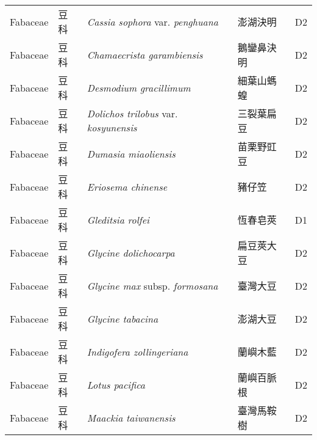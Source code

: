 {\begin{longtable}{p{2.5cm}p{2.5cm}p{4.5cm}p{2.5cm}p{3cm}}
    Fabaceae & 豆科 & \textit{Cassia sophora} var. \textit{penghuana}  & 澎湖決明 & D2 \index{Cassia@\textit{Cassia}!sophora@\textit{sophora}!var. penghuana@var. \textit{penghuana}}  \index{澎湖決明} \\
    Fabaceae & 豆科 & \textit{Chamaecrista garambiensis}  & 鵝鑾鼻決明 & D2 \index{Chamaecrista@\textit{Chamaecrista}!garambiensis@\textit{garambiensis}}  \index{鵝鑾鼻決明} \\
    Fabaceae & 豆科 & \textit{Desmodium gracillimum}  & 細葉山螞蝗 & D2 \index{Desmodium@\textit{Desmodium}!gracillimum@\textit{gracillimum}}  \index{細葉山螞蝗} \\
    Fabaceae & 豆科 & \textit{Dolichos trilobus} var. \textit{kosyunensis}  & 三裂葉扁豆 & D2 \index{Dolichos@\textit{Dolichos}!trilobus@\textit{trilobus}!var. kosyunensis@var. \textit{kosyunensis}}  \index{三裂葉扁豆} \\
    Fabaceae & 豆科 & \textit{Dumasia miaoliensis}  & 苗栗野豇豆 & D2 \index{Dumasia@\textit{Dumasia}!miaoliensis@\textit{miaoliensis}}  \index{苗栗野豇豆} \\
    Fabaceae & 豆科 & \textit{Eriosema chinense}  & 豬仔笠 & D2 \index{Eriosema@\textit{Eriosema}!chinense@\textit{chinense}}  \index{豬仔笠} \\
    Fabaceae & 豆科 & \textit{Gleditsia rolfei}  & 恆春皂莢 & D1 \index{Gleditsia@\textit{Gleditsia}!rolfei@\textit{rolfei}}  \index{恆春皂莢} \\
    Fabaceae & 豆科 & \textit{Glycine dolichocarpa}  & 扁豆莢大豆 & D2 \index{Glycine@\textit{Glycine}!dolichocarpa@\textit{dolichocarpa}}  \index{扁豆莢大豆} \\
    Fabaceae & 豆科 & \textit{Glycine max} subsp. \textit{formosana}  & 臺灣大豆 & D2 \index{Glycine@\textit{Glycine}!max@\textit{max}!subsp. formosana@subsp. \textit{formosana}}  \index{臺灣大豆} \\
    Fabaceae & 豆科 & \textit{Glycine tabacina}  & 澎湖大豆 & D2 \index{Glycine@\textit{Glycine}!tabacina@\textit{tabacina}}  \index{澎湖大豆} \\
    Fabaceae & 豆科 & \textit{Indigofera zollingeriana}  & 蘭嶼木藍 & D2 \index{Indigofera@\textit{Indigofera}!zollingeriana@\textit{zollingeriana}}  \index{蘭嶼木藍} \\
    Fabaceae & 豆科 & \textit{Lotus pacifica}  & 蘭嶼百脈根 & D2 \index{Lotus@\textit{Lotus}!pacifica@\textit{pacifica}}  \index{蘭嶼百脈根} \\
    Fabaceae & 豆科 & \textit{Maackia taiwanensis}  & 臺灣馬鞍樹 & D2 \index{Maackia@\textit{Maackia}!taiwanensis@\textit{taiwanensis}}  \index{臺灣馬鞍樹} \\

\end{longtable}}
